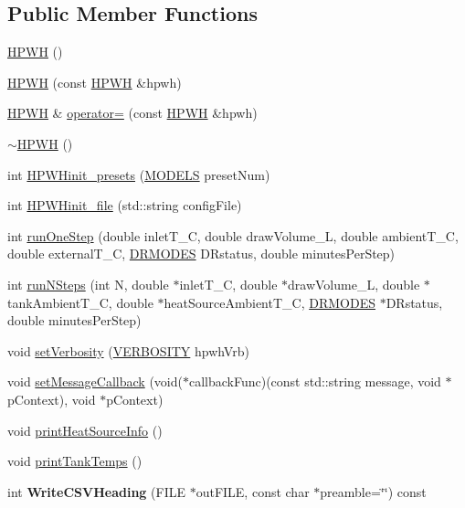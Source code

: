 \subsection*{Public Member Functions}
\begin{DoxyCompactItemize}
\item 
\hyperlink{class_h_p_w_h_a07cd672278715ee61604ae26137d16f7}{H\-P\-W\-H} ()
\item 
\hyperlink{class_h_p_w_h_aa28907ae69a5f53e53bb14554c9af73f}{H\-P\-W\-H} (const \hyperlink{class_h_p_w_h}{H\-P\-W\-H} \&hpwh)
\item 
\hyperlink{class_h_p_w_h}{H\-P\-W\-H} \& \hyperlink{class_h_p_w_h_a6e231a8737d540f89aeeb028663f65a9}{operator=} (const \hyperlink{class_h_p_w_h}{H\-P\-W\-H} \&hpwh)
\item 
\hyperlink{class_h_p_w_h_ad92e11f51e981157e85ac8855269d50a}{$\sim$\-H\-P\-W\-H} ()
\item 
int \hyperlink{class_h_p_w_h_a74b3a6c1352adb5d38e7c00ad5952f30}{H\-P\-W\-Hinit\-\_\-presets} (\hyperlink{class_h_p_w_h_acf117eb928a21b7b757b653455a2338e}{M\-O\-D\-E\-L\-S} preset\-Num)
\item 
int \hyperlink{class_h_p_w_h_a348c1c4a90ec1ee5e91c84ab8d3bc5b1}{H\-P\-W\-Hinit\-\_\-file} (std\-::string config\-File)
\item 
int \hyperlink{class_h_p_w_h_aef8f08c0115787826a64b34897468b45}{run\-One\-Step} (double inlet\-T\-\_\-\-C, double draw\-Volume\-\_\-\-L, double ambient\-T\-\_\-\-C, double external\-T\-\_\-\-C, \hyperlink{class_h_p_w_h_a6a74814715ed6a33a75fd0d9dc3e7107}{D\-R\-M\-O\-D\-E\-S} D\-Rstatus, double minutes\-Per\-Step)
\item 
int \hyperlink{class_h_p_w_h_a904e3a0f6bdd7eaaeed43839bac779fc}{run\-N\-Steps} (int N, double $\ast$inlet\-T\-\_\-\-C, double $\ast$draw\-Volume\-\_\-\-L, double $\ast$tank\-Ambient\-T\-\_\-\-C, double $\ast$heat\-Source\-Ambient\-T\-\_\-\-C, \hyperlink{class_h_p_w_h_a6a74814715ed6a33a75fd0d9dc3e7107}{D\-R\-M\-O\-D\-E\-S} $\ast$D\-Rstatus, double minutes\-Per\-Step)
\item 
void \hyperlink{class_h_p_w_h_a7c81dfc13de82ce9ca01300bde0d4b22}{set\-Verbosity} (\hyperlink{class_h_p_w_h_aa493e3f78affa7dafde7e297cc68673c}{V\-E\-R\-B\-O\-S\-I\-T\-Y} hpwh\-Vrb)
\item 
void \hyperlink{class_h_p_w_h_af20440c49f36a44b66b82d16b0b6a74b}{set\-Message\-Callback} (void($\ast$callback\-Func)(const std\-::string message, void $\ast$p\-Context), void $\ast$p\-Context)
\item 
void \hyperlink{class_h_p_w_h_a49d923bea7be1ad1ee60c02163bbf6cc}{print\-Heat\-Source\-Info} ()
\item 
void \hyperlink{class_h_p_w_h_a59d5b765bf4490be7bd5954a5ab7324e}{print\-Tank\-Temps} ()
\item 
\hypertarget{class_h_p_w_h_ac8bced7dc05598df491f907cd895ccaa}{int {\bfseries Write\-C\-S\-V\-Heading} (F\-I\-L\-E $\ast$out\-F\-I\-L\-E, const char $\ast$preamble=\char`\"{}\char`\"{}) const }\label{class_h_p_w_h_ac8bced7dc05598df491f907cd895ccaa}


\end{DoxyCompactItemize}
